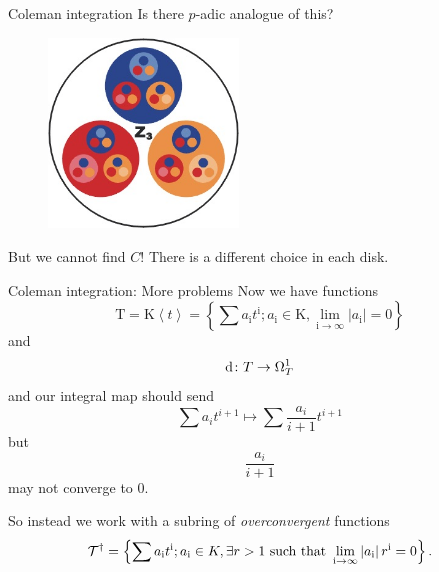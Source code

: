 \begin{frame}{Coleman integration}
    Is there $p$-adic analogue of this?


\begin{figure}
{
    \includegraphics[width=0.45\textwidth]{padic.jpg}
}
\caption*{}
\end{figure}




{
    But we cannot find $C$! There is a different choice in each disk.
}

\end{frame}

\begin{frame}{Coleman integration: More problems}
    Now we have functions
    \[\mathrm{T}=\mathrm{K}\left\langle t\right\rangle=\left\{\sum a_{\mathrm{i}} t^{\mathrm{i}} ; a_{\mathrm{i}} \in \mathrm{K}, \lim _{\mathrm{i} \rightarrow \infty}\left|a_{\mathrm{i}}\right|=0\right\}\]
    and
    \[\mathop{}\!\mathrm{d} \colon T \to \Omega ^1_{T}\]
    and our integral map should send
    \[ \sum a_{i} t^{i+1}\mapsto\sum \frac{a_{i}}{i+1} t^{i+1} \]
    but
    \[\frac{a_i}{i+1}\]
    may not converge to 0.

    So instead we work with a subring of \emph{overconvergent} functions
    \[\mathcal{T}^{\dagger}=\left\{\sum a_{\mathrm{i}} t^{\mathrm{i}} ; a_{\mathrm{i}} \in K, \exists r>1 \text { such that } \lim _{\mathrm{i} \rightarrow \infty}\left|a_{\mathrm{i}}\right| r^{\mathrm{i}}=0\right\}\text.\]

\end{frame}


